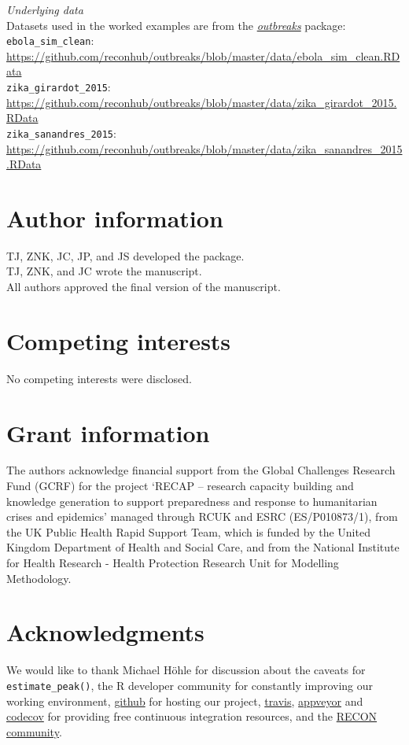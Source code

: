\documentclass[9pt,a4paper]{extarticle}
\begin{document}
\textit{Underlying data}\\
Datasets used in the worked examples are from the \href{https://cran.r-project.org/web/packages/outbreaks/index.html}{\textit{outbreaks}} package:\\
\texttt{ebola\_sim\_clean}: \url{https://github.com/reconhub/outbreaks/blob/master/data/ebola_sim_clean.RData}\\
\texttt{zika\_girardot\_2015}: \url{https://github.com/reconhub/outbreaks/blob/master/data/zika_girardot_2015.RData}\\
\texttt{zika\_sanandres\_2015}: \url{https://github.com/reconhub/outbreaks/blob/master/data/zika_sanandres_2015.RData}

\section*{Author information}

TJ, ZNK, JC, JP, and JS developed the package.\\
TJ, ZNK, and JC wrote the manuscript.\\
All authors approved the final version of the manuscript.

\section*{Competing interests}

No competing interests were disclosed.

\section*{Grant information}

The authors acknowledge financial support from the Global Challenges Research Fund (GCRF) for the project ‘RECAP – research capacity building and knowledge generation to support preparedness and response to humanitarian crises and epidemics’ managed through RCUK and ESRC (ES/P010873/1), from the UK Public Health Rapid Support Team, which is funded by the United Kingdom Department of Health and Social Care, and from the National Institute for Health Research - Health Protection Research Unit for Modelling Methodology.

\section*{Acknowledgments}

We would like to thank Michael H\"ohle for discussion about the caveats for \texttt{estimate\_peak()}, the R developer community for constantly improving our working environment, \href{https://www.github.com}{github} for hosting our project, \href{https://travis-ci.org/}{travis}, \href{https://www.appveyor.com/}{appveyor} and \href{https://codecov.io/}{codecov} for providing free continuous integration resources, and the \href{http://www.repidemicsconsortium.org/}{RECON community}. 


{\small
}
\end{document}
